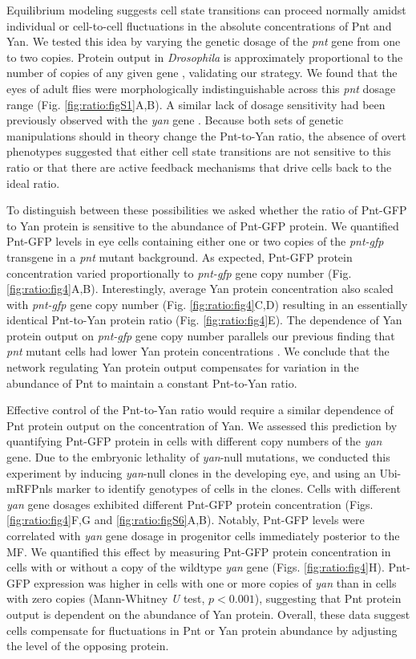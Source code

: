 Equilibrium modeling suggests cell state transitions can proceed normally amidst individual or cell-to-cell fluctuations in the absolute concentrations of Pnt and Yan. We tested this idea by varying the genetic dosage of the \textit{pnt} gene from one to two copies. Protein output in \textit{Drosophila} is approximately proportional to the number of copies of any given gene \cite{Lucchesi1973}, validating our strategy. We found that the eyes of adult flies were morphologically indistinguishable across this \textit{pnt} dosage range (Fig. \ref{fig:ratio:figS1}A,B). A similar lack of dosage sensitivity had been previously observed with the \textit{yan} gene \cite{Pelaez2015a}. Because both sets of genetic manipulations should in theory change the Pnt-to-Yan ratio, the absence of overt phenotypes suggested that either cell state transitions are not sensitive to this ratio or that there are active feedback mechanisms that drive cells back to the ideal ratio.

To distinguish between these possibilities we asked whether the ratio of Pnt-GFP to Yan protein is sensitive to the abundance of Pnt-GFP protein. We quantified Pnt-GFP levels in eye cells containing either one or two copies of the \textit{pnt-gfp} transgene in a \textit{pnt} mutant background. As expected, Pnt-GFP protein concentration varied proportionally to \textit{pnt-gfp} gene copy number (Fig. \ref{fig:ratio:fig4}A,B). Interestingly, average Yan protein concentration also scaled with \textit{pnt-gfp} gene copy number (Fig. \ref{fig:ratio:fig4}C,D) resulting in an essentially identical Pnt-to-Yan protein ratio (Fig. \ref{fig:ratio:fig4}E). The dependence of Yan protein output on \textit{pnt-gfp} gene copy number parallels our previous finding that \textit{pnt} mutant cells had lower Yan protein concentrations \cite{Pelaez2015a}. We conclude that the network regulating Yan protein output compensates for variation in the abundance of Pnt to maintain a constant Pnt-to-Yan ratio.

Effective control of the Pnt-to-Yan ratio would require a similar dependence of Pnt protein output on the concentration of Yan. We assessed this prediction by quantifying Pnt-GFP protein in cells with different copy numbers of the \textit{yan} gene. Due to the embryonic lethality of \textit{yan}-null mutations, we conducted this experiment by inducing \textit{yan}-null clones in the developing eye, and using an Ubi-mRFPnls marker to identify genotypes of cells in the clones. Cells with different \textit{yan} gene dosages exhibited different Pnt-GFP protein concentration (Figs. \ref{fig:ratio:fig4}F,G and \ref{fig:ratio:figS6}A,B). Notably, Pnt-GFP levels were correlated with \textit{yan} gene dosage in progenitor cells immediately posterior to the MF. We quantified this effect by measuring Pnt-GFP protein concentration in cells with or without a copy of the wildtype \textit{yan} gene (Figs. \ref{fig:ratio:fig4}H). Pnt-GFP expression was higher in cells with one or more copies of \textit{yan} than in cells with zero copies (Mann-Whitney \textit{U} test, $p<0.001$), suggesting that Pnt protein output is dependent on the abundance of Yan protein. Overall, these data suggest cells compensate for fluctuations in Pnt or Yan protein abundance by adjusting the level of the opposing protein. 

